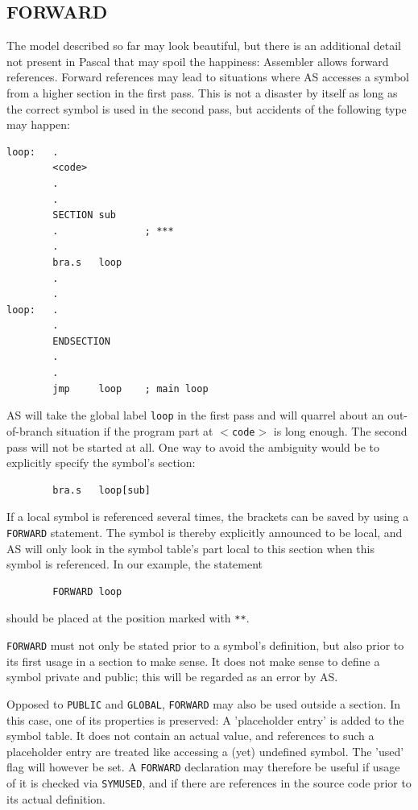 \documentclass[12pt,twoside]{report}
\makeatletter
\newcommand{\tty}[1]{{\tt #1}}
\newcommand{\ttindex}[1]{\index{#1@{\tt #1}}}
\newcommand{\asname}{{AS}}
\makeatother
\begin{document}

\subsection{FORWARD}
\ttindex{FORWARD}

The model described so far may look beautiful, but there is an
additional detail not present in Pascal that may spoil the happiness:
Assembler allows forward references.  Forward references may lead to
situations where \asname{} accesses a symbol from a higher section in the
first pass.  This is not a disaster by itself as long as the correct
symbol is used in the second pass, but accidents of the following
type may happen:
\begin{verbatim}
loop:   .
        <code>
        .
        .
        SECTION sub
        .               ; ***
        .
        bra.s   loop
        .
        .
loop:   .
        .
        ENDSECTION
        .
        .
        jmp     loop    ; main loop
\end{verbatim}
\asname{} will take the global label \tty{loop} in the first pass and will
quarrel about an out-of-branch situation if the program part at
\tty{$<$code$>$} is long enough.  The second pass will not be
started at all.  One way to avoid the ambiguity would be to
explicitly specify the symbol's section:
\begin{verbatim}
        bra.s   loop[sub]
\end{verbatim}
If a local symbol is referenced several times, the brackets can be saved
by using a \tty{FORWARD} statement.  The symbol is thereby explicitly
announced to be local, and \asname{} will only look in the symbol table's
part local to this section when this symbol is referenced.  In our
example, the statement
\begin{verbatim}
        FORWARD loop
\end{verbatim}
should be placed at the position marked with \tty{***}.

\tty{FORWARD} must not only be stated prior to a symbol's definition, but
also prior to its first usage in a section to make sense.  It does not
make sense to define a symbol private and public; this will be regarded as
an error by \asname{}.

Opposed to \tty{PUBLIC} and \tty{GLOBAL}, \tty{FORWARD} may also be used
outside a section.  In this case, one of its properties is preserved: A
'placeholder entry' is added to the symbol table.  It does not contain an
actual value, and references to such a placeholder entry are treated like
accessing a (yet) undefined symbol.  The 'used' flag will however be set.
A \tty{FORWARD} declaration may therefore be useful if usage of it is
checked via \tty{SYMUSED}, and if there are references in the source code
prior to its actual definition.
\end{document}
